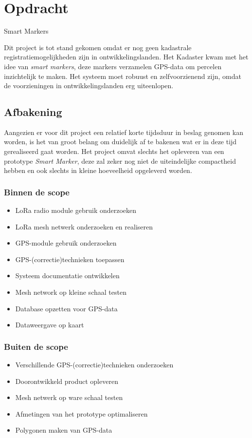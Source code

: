 \section{Opdracht}
\label{sec:opdracht}
Smart Markers

Dit project is tot stand gekomen omdat er nog geen kadastrale registratiemogelijkheden 
zijn in ontwikkelingslanden. Het Kadaster kwam met het idee van \textit{smart markers}, 
deze markers verzamelen GPS-data om percelen inzichtelijk te maken. Het systeem moet 
robuust en zelfvoorzienend zijn, omdat de voorzieningen in ontwikkelingslanden erg 
uiteenlopen.

\subsection{Afbakening}
Aangezien er voor dit project een relatief korte tijdsduur in beslag genomen
kan worden, is het van groot belang om duidelijk af te bakenen wat er in deze
tijd gerealiseerd gaat worden.
Het project omvat slechts het opleveren van een prototype \textit{Smart Marker},
deze zal zeker nog niet de uiteindelijke compactheid hebben en ook slechts in 
kleine hoeveelheid opgeleverd worden.

\subsubsection{Binnen de scope}
\begin{itemize}
    \item LoRa radio module gebruik onderzoeken
    \item LoRa mesh netwerk onderzoeken en realiseren
    \item GPS-module gebruik onderzoeken
    \item GPS-(correctie)technieken toepassen
    \item Systeem documentatie ontwikkelen
    \item Mesh network op kleine schaal testen
    \item Database opzetten voor GPS-data
    \item Dataweergave op kaart
\end{itemize}

\subsubsection{Buiten de scope}
\begin{itemize}
    \item Verschillende GPS-(correctie)technieken onderzoeken
    \item Doorontwikkeld product opleveren
    \item Mesh netwerk op ware schaal testen
    \item Afmetingen van het prototype optimaliseren
    \item Polygonen maken van GPS-data
\end{itemize}

